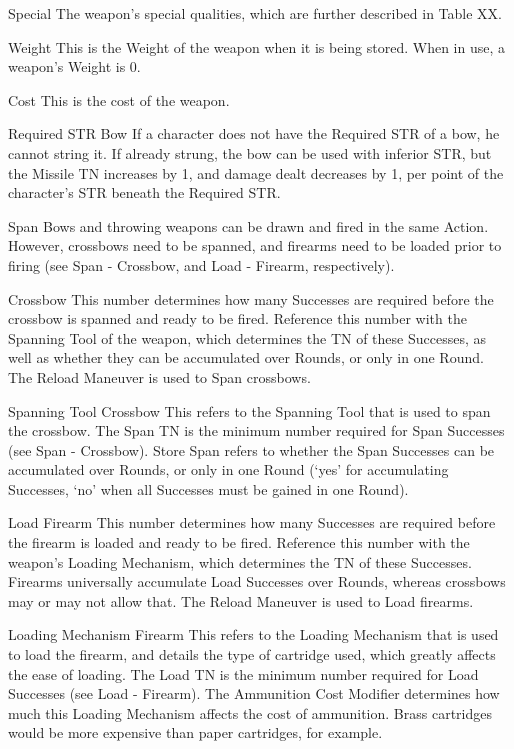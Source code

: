 \documentclass[oneside,11pt,english]{book}
\begin{document}
 

Special 
The weapon’s special qualities, which are further described in Table XX. 

 

Weight 
This is the Weight of the weapon when it is being stored. When in use, a weapon’s Weight is 0. 

 

Cost 
This is the cost of the weapon. 

 

Required STR 
Bow 
If a character does not have the Required STR of a bow, he cannot string it. If already strung, the bow can 
be used with inferior STR, but the Missile TN increases by 1, and damage dealt decreases by 1, per point 
of the character’s STR beneath the Required STR. 

 

Span 
Bows and throwing weapons can be drawn and fired in the same Action. However, crossbows need to be 
spanned, and firearms need to be loaded prior to firing (see Span - Crossbow, and Load - Firearm, 
respectively). 

 

Crossbow 
This number determines how many Successes are required before the crossbow is spanned and ready to 
be fired. Reference this number with the Spanning Tool of the weapon, which determines the TN of these 
Successes, as well as whether they can be accumulated over Rounds, or only in one Round. The Reload 
Maneuver is used to Span crossbows. 

 

Spanning Tool 
Crossbow 
This refers to the Spanning Tool that is used to span the crossbow. The Span TN is the minimum number 
required for Span Successes (see Span - Crossbow). Store Span refers to whether the Span Successes can 
be accumulated over Rounds, or only in one Round (‘yes’ for accumulating Successes, ‘no’ when all 
Successes must be gained in one Round). 


 

Load 
Firearm 
This number determines how many Successes are required before the firearm is loaded and ready to be 
fired. Reference this number with the weapon’s Loading Mechanism, which determines the TN of these 
Successes. Firearms universally accumulate Load Successes over Rounds, whereas crossbows may or 
may not allow that. The Reload Maneuver is used to Load firearms. 

 

Loading Mechanism 
Firearm 
This refers to the Loading Mechanism that is used to load the firearm, and details the type of cartridge 
used, which greatly affects the ease of loading. The Load TN is the minimum number required for Load 
Successes (see Load - Firearm). The Ammunition Cost Modifier determines how much this Loading 
Mechanism affects the cost of ammunition. Brass cartridges would be more expensive than paper 
cartridges, for example. 
 
\end{document}
